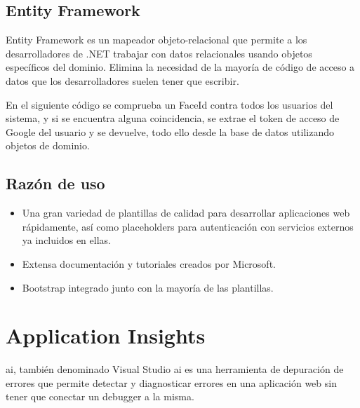 

\subsection{Entity Framework}

Entity Framework es un mapeador objeto-relacional que permite a los desarrolladores de .NET trabajar con datos relacionales usando objetos específicos del dominio. Elimina la necesidad de la mayoría de código de acceso a datos que los desarrolladores suelen tener que escribir.

En el siguiente código se comprueba un FaceId contra todos los usuarios del sistema, y si se encuentra alguna coincidencia, se extrae el token de acceso de Google del usuario y se devuelve, todo ello desde la base de datos utilizando objetos de dominio. 



\subsection{Razón de uso}

\begin{itemize}
	\item Una gran variedad de plantillas de calidad para desarrollar aplicaciones web rápidamente, así como placeholders para autenticación con servicios externos ya incluidos en ellas.
	\item Extensa documentación y tutoriales creados por Microsoft.
	\item Bootstrap integrado junto con la mayoría de las plantillas.

\end{itemize}

\section{Application Insights}

\acrfull{ai}\cite{AI}, también denominado Visual Studio \acrfull{ai} es una herramienta de depuración de errores que permite detectar y diagnosticar errores en una aplicación web sin tener que conectar un debugger a la misma.

